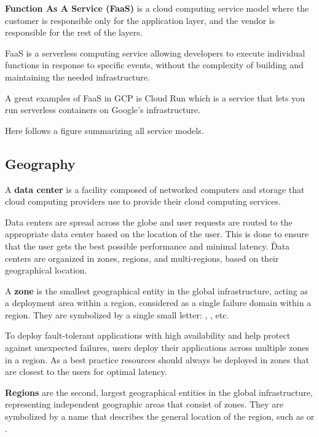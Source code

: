 \textbf{Function As A Service (FaaS)} is a cloud computing service model where the customer is responsible only for
the application layer, and the vendor is responsible for the rest of the layers.
\ed

FaaS is a serverless computing service allowing developers to execute individual functions in response to specific
events, without the complexity of building and maintaining the needed infrastructure.

\be
A great examples of FaaS in GCP is Cloud Run which is a service that lets you run serverless containers on Google's
infrastructure.
\ee

Here follows a figure summarizing all service models.


\subsection{Geography}\label{subsec:geography}

A \textbf{data center} is a facility composed of networked computers and storage that cloud computing providers use to
provide their cloud computing services.
\ed

Data centers are spread across the globe and user requests are routed to the appropriate data center based on the
location of the user. This is done to ensure that the user gets the best possible performance and minimal latency. \v

Data centers are organized in zones, regions, and multi-regions, based on their geographical location.

\bd[Zone]
A \textbf{zone} is the smallest geographical entity in the global infrastructure, acting as a deployment area within a
region, considered as a single failure domain within a region. They are symbolized by a single small letter: ,
, etc.
\ed

To deploy fault-tolerant applications with high availability and help protect against unexpected failures, users
deploy their applications across multiple zones in a region. As a best practice resources should always be deployed
in zones that are closest to the users for optimal latency.

\bd[Region]
\textbf{Regions} are the second, largest geographical entities in the global infrastructure, representing independent
geographic areas that consist of zones. They are symbolized by a name that describes the general location of the region,
such as  or .
\ed

